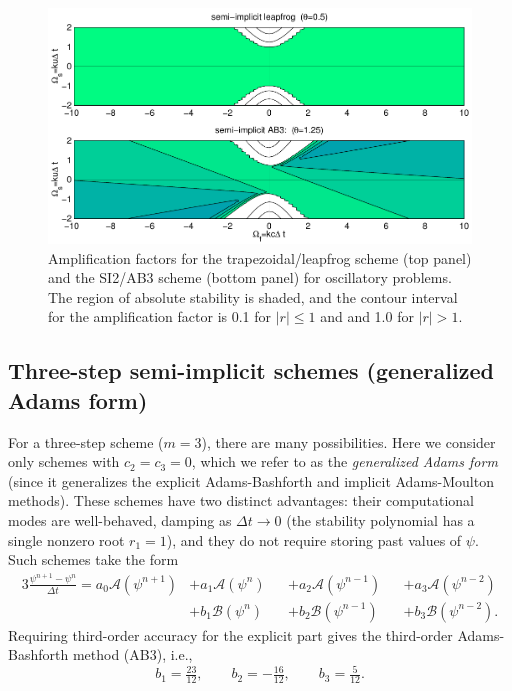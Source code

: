 \documentclass[12pt]{article}
\newcommand{\mycaption}[1]{\Mycaption{5.5in}{#1}}
\newcommand{\Mycaption}[2]{\parbox[t]{#1}{\caption{#2}}}
\newcommand{\dt}{\Delta t}
\newcommand{\opA}{\mathcal{A}}
\newcommand{\opB}{\mathcal{B}}
\begin{document}
\begin{figure}[bt]
\begin{center}
\includegraphics[width=6.5in,clip]{siplot}
\mycaption{\label{fig:siplot}
Amplification factors for the trapezoidal/leapfrog scheme (top panel) 
and the SI2/AB3 scheme (bottom panel) for 
oscillatory problems.  The region of absolute stability is shaded,
and the contour interval for the amplification factor is 0.1 for $|r|\le1$ and 
and 1.0 for $|r|>1$.}
\end{center}
\end{figure}

\pagebreak[3]
\subsection{Three-step semi-implicit schemes (generalized Adams form)}

For a three-step scheme ($m=3$), there are many possibilities.  Here we
consider only schemes with $c_2=c_3=0$, which we refer to as the
\emph{generalized Adams form} (since it generalizes the explicit 
Adams-Bashforth and implicit Adams-Moulton methods).  These schemes have two
distinct advantages:  their computational modes are well-behaved, damping as
$\dt\to0$ (the stability polynomial has a single nonzero root $r_1=1$), 
and they do not require storing past values of $\psi$.  Such schemes take the
form
\begin{alignat}{3}
   \frac{\psi^{n+1}-\psi^{n}}{\dt} = a_0 \opA(\psi^{n+1})
      &+ a_1 \opA(\psi^{n}) &&+ a_2 \opA(\psi^{n-1}) &&+ a_3 \opA(\psi^{n-2})
\nonumber
\\
  &+ b_1 \opB(\psi^{n}) &&+ b_2 \opB(\psi^{n-1}) &&+ b_3 \opB(\psi^{n-2}) .
\label{eq:SI-AB3}
\end{alignat}
Requiring third-order accuracy for the explicit part gives the third-order
Adams-Bashforth method (AB3), i.e.,
\begin{equation}
b_1=\tfrac{23}{12},
\qquad
b_2=-\tfrac{16}{12},
\qquad
b_3= \tfrac{5}{12}.
\label{coeff:AB3}
\end{equation}
\end{document}
